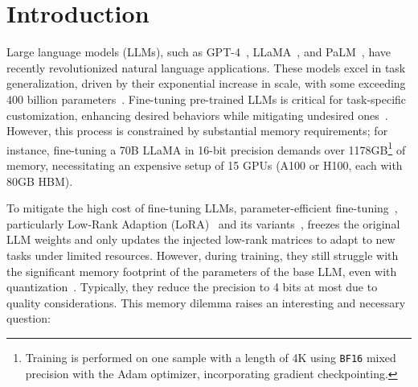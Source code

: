 
\section{Introduction}
Large language models (LLMs), such as GPT-4~\citep{openai:2023gpt4}, LLaMA~\citep{Hugo:2023llama,Hugo:2023llama2,meta2024llama3}, and PaLM~\citep{Aak:2023palm}, have recently revolutionized natural language applications. 
These models excel in task generalization, driven by their exponential increase in scale, with some exceeding 400 billion parameters~\citep{meta2024llama3}.
Fine-tuning pre-trained LLMs is critical for task-specific customization, enhancing desired behaviors while mitigating undesired ones~\citep{qi2024finetuning}.
However, this process is constrained by substantial memory requirements; 
for instance, fine-tuning a 70B LLaMA in 16-bit precision demands over 1178GB\footnote{
Training is performed on one sample with a length of 4K using \texttt{BF16} mixed precision with the Adam optimizer, incorporating gradient checkpointing.}
of memory, necessitating an expensive setup of 15 GPUs (A100 or H100, each with 80GB HBM).

To mitigate the high cost of fine-tuning LLMs, parameter-efficient fine-tuning~\citep{Prefix2021,Brian:2021PT,P-Tuning2021,Qiu:OFT2023,liu2024boft,Liu:2022IA3}, particularly Low-Rank Adaption (LoRA)~\citep{Edw:2022lora} and its variants~\citep{liu2024dora,ding2023sora,zi2023deltalora,zhang2023adalora,kala2023rslora}, freezes the original LLM weights and only updates the injected low-rank matrices to adapt to new tasks under limited resources.
However, during training, they still struggle with the significant memory footprint of the parameters of the base LLM, even with quantization~\citep{Tim:2023qlora,Xu:2023QALoRA,li2024loftq,guo2024lqlora,OPTQ2023,chai2023int21}.
Typically, they reduce the precision to 4 bits at most due to quality considerations.
This memory dilemma raises an interesting and necessary question:

